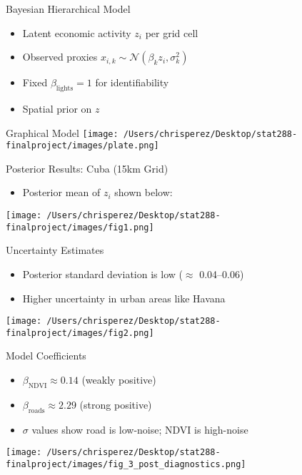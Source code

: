 \documentclass{beamer}
\begin{document}
\begin{frame}{Bayesian Hierarchical Model}
\begin{itemize}
  \item Latent economic activity $z_i$ per grid cell
  \item Observed proxies $x_{i,k} \sim \mathcal{N}(\beta_k z_i, \sigma_k^2)$
  \item Fixed $\beta_{\text{lights}} = 1$ for identifiability
  \item Spatial prior on $z$
\end{itemize}
\end{frame}

\begin{frame}{Graphical Model}
\centering
\texttt{[image: /Users/chrisperez/Desktop/stat288-finalproject/images/plate.png]}
\end{frame}

\begin{frame}{Posterior Results: Cuba (15km Grid)}
\begin{itemize}
  \item Posterior mean of $z_i$ shown below:
\end{itemize}
\centering
\texttt{[image: /Users/chrisperez/Desktop/stat288-finalproject/images/fig1.png]}
\end{frame}

\begin{frame}{Uncertainty Estimates}
\begin{itemize}
  \item Posterior standard deviation is low ($\approx$ 0.04--0.06)
  \item Higher uncertainty in urban areas like Havana
\end{itemize}
\centering
\texttt{[image: /Users/chrisperez/Desktop/stat288-finalproject/images/fig2.png]}
\end{frame}

\begin{frame}{Model Coefficients}
\centering
\begin{itemize}
  \item $\beta_{\text{NDVI}} \approx 0.14$ (weakly positive)
  \item $\beta_{\text{roads}} \approx 2.29$ (strong positive)
  \item $\sigma$ values show road is low-noise; NDVI is high-noise
\end{itemize}
\texttt{[image: /Users/chrisperez/Desktop/stat288-finalproject/images/fig\_3\_post\_diagnostics.png]}
\end{frame}
\end{document}
